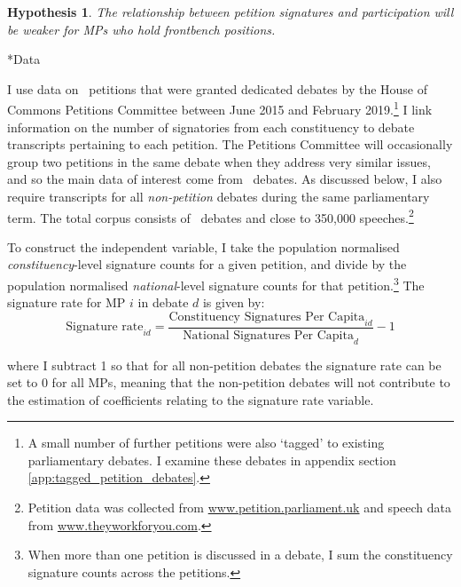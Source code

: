 \documentclass[12pt]{article}
\makeatletter
\renewcommand{\section}{\@startsection{section}{1}{0mm}{-\baselineskip}{0.20\baselineskip}{\centering\normalfont\normalsize\scshape}}
\newtheorem{hypothesis}{\small\sc Hypothesis}
\makeatother
\begin{document}
\begin{hypothesis} \label{hyp:government}
The relationship between petition signatures and participation will be weaker for MPs who hold frontbench positions.
\end{hypothesis} 

\section*{Data}

I use data on \unskip\ petitions that were granted dedicated debates by the House of Commons Petitions Committee between June 2015 and February 2019.\footnote{A small number of further petitions were also `tagged' to existing parliamentary debates. I examine these debates in appendix section \ref{app:tagged_petition_debates}.} I link information on the number of signatories from each constituency to debate transcripts pertaining to each petition. The Petitions Committee will occasionally group two petitions in the same debate when they address very similar issues, and so the main data of interest come from \unskip\ debates. As discussed below, I also require transcripts for all \emph{non-petition} debates during the same parliamentary term. The total corpus consists of \unskip\ debates and close to 350,000 speeches.\footnote{Petition data was collected from \href{https://petition.parliament.uk}{www.petition.parliament.uk} and speech data from \href{https://www.theyworkforyou.com}{www.theyworkforyou.com}.}

To construct the independent variable, I take the population normalised \emph{constituency}-level signature counts for a given petition, and divide by the population normalised \emph{national}-level signature counts for that petition.\footnote{When more than one petition is discussed in a debate, I sum the constituency signature counts across the petitions.} The signature rate for MP $i$ in debate $d$ is given by:
\begin{equation}\label{eq:rel_sig_rate}
\text{Signature rate}_{id} = \frac{\text{Constituency Signatures Per Capita}_{id}}{\text{National Signatures Per Capita}_d} - 1
\end{equation}

\noindent where I subtract 1 so that for all non-petition debates the signature rate can be set to 0 for all MPs, meaning that the non-petition debates will not contribute to the estimation of coefficients relating to the signature rate variable. 
\end{document}
